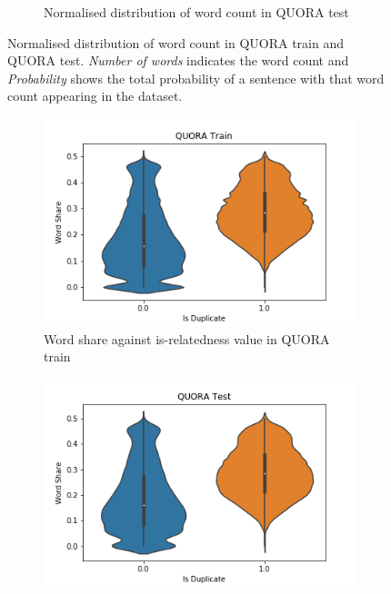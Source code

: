 \begin{enumerate}
\begin{figure}
\begin{subfigure}[b]{.5\textwidth}
		\caption{Normalised distribution of word count in QUORA test}
		\label{fig:quora_test_words}
	\end{subfigure}
	\caption[Normalised distribution of word count in QUORA train and QUORA test.]{Normalised distribution of word count in QUORA train and QUORA test. \textit{Number of words} indicates the word count and \textit{Probability} shows the total probability of a sentence with that word count appearing in the dataset.}
	\label{fig:quora_words}
\end{figure}

\begin{figure}
	\captionsetup[subfigure]{justification=centering}
	\centering
	\begin{subfigure}[b]{.5\textwidth}
		\centering
		\includegraphics[width=\textwidth]{figures/semantic_textual_similarity/introduction/quora_train_word_share.png}
		\caption{Word share against is-relatedness value in QUORA train}
		\label{fig:quora_train_word_share}
	\end{subfigure}%
	\begin{subfigure}[b]{.5\textwidth}
		\centering
		\includegraphics[width=\textwidth]{figures/semantic_textual_similarity/introduction/quora_test_word_share.png}

\end{subfigure}
\end{figure}
\end{enumerate}
